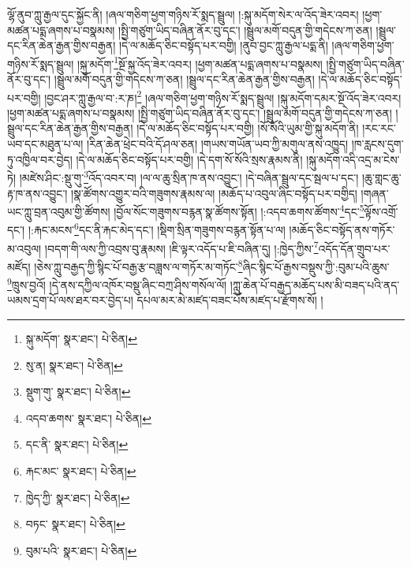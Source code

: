 ལྷོ་ནུབ་ཀླུ་རྒྱལ་དུང་སྐྱོང་ནི། །ཞལ་གཅིག་ཕྱག་གཉིས་རོ་སྨད་སྦྲུལ། །:སྐུ་མདོག་སེར་ལ་འོད་ཟེར་འབར། །ཕྱག་མཚན་པདྨ་ཞགས་པ་བསྣམས། །སྤྱི་གཙུག་ཡིད་བཞིན་ནོར་བུ་དང་། །སྦྲུལ་མགོ་བདུན་གྱི་གདེངས་ཀ་ཅན། །སྦྲུལ་དང་རིན་ཆེན་རྒྱན་གྱིས་བརྒྱན། །དེ་ལ་མཆོད་ཅིང་བསྟོད་པར་བགྱི། །ནུབ་བྱང་ཀླུ་རྒྱལ་པདྨ་ནི། །ཞལ་གཅིག་ཕྱག་གཉིས་རོ་སྨད་སྦྲུལ། །སྐུ་མདོག་\footnote{སྐུ་མདོག་  སྣར་ཐང་།  པེ་ཅིན། }སྔོ་སྐྱ་འོད་ཟེར་འབར། །ཕྱག་མཚན་པདྨ་ཞགས་པ་བསྣམས། །སྤྱི་གཙུག་ཡིད་བཞིན་ནོར་བུ་དང་། །སྦྲུལ་མགོ་བདུན་གྱི་གདེངས་ཀ་ཅན། །སྦྲུལ་དང་རིན་ཆེན་རྒྱན་གྱིས་བརྒྱན། །དེ་ལ་མཆོད་ཅིང་བསྟོད་པར་བགྱི། །བྱང་ཤར་ཀླུ་རྒྱལ་བ་:ར་ཎ།\footnote{སུ་ན།  སྣར་ཐང་།  པེ་ཅིན། } །ཞལ་གཅིག་ཕྱག་གཉིས་རོ་སྨད་སྦྲུལ། །སྐུ་མདོག་དམར་སྔོ་འོད་ཟེར་འབར། །ཕྱག་མཚན་པདྨ་ཞགས་པ་བསྣམས། །སྤྱི་གཙུག་ཡིད་བཞིན་ནོར་བུ་དང་། །སྦྲུལ་མགོ་བདུན་གྱི་གདེངས་ཀ་ཅན། །སྦྲུལ་དང་རིན་ཆེན་རྒྱན་གྱིས་བརྒྱན། །དེ་ལ་མཆོད་ཅིང་བསྟོད་པར་བགྱི། །སོ་སོའི་ཡུམ་གྱི་སྐུ་མདོག་ནི། །རང་རང་ཡབ་དང་མཐུན་པ་ལ། །རིན་ཆེན་ཕྲེང་བའི་དོ་ཤལ་ཅན། །གཡས་གཡོན་ཡབ་ཀྱི་མགུལ་ནས་འཁྱུད། །ཁ་རླངས་དུག་ཏུ་འཁྱིལ་བར་བྱེད། །དེ་ལ་མཆོད་ཅིང་བསྟོད་པར་བགྱི། །དེ་དག་སོ་སོའི་སྲས་རྣམས་ནི། །སྐུ་མདོག་འདི་འདྲ་མ་ངེས་ཏེ། །མཛེས་ཤིང་:སྡུ་གུ་\footnote{སྡུག་གུ་  སྣར་ཐང་།  པེ་ཅིན། }འོད་འབར་བ། །ལ་ལ་ཆུ་སྲིན་ཁ་ནས་འབྱུང་། །དེ་བཞིན་སྦྲུལ་དང་སྦལ་པ་དང་། །ཆུ་གླང་ཆུ་རྟ་ཁ་ནས་འབྱུང་། །སྣ་ཚོགས་འགྱུར་བའི་གཟུགས་རྣམས་ལ། །མཆོད་པ་འབུལ་ཞིང་བསྟོད་པར་བགྱིད། །གཞན་ཡང་ཀླུ་བྲན་འབུམ་གྱི་ཚོགས། །བྱོལ་སོང་གཟུགས་བརྙན་སྣ་ཚོགས་སྟོན། །:འདབ་ཆགས་ཚོགས་\footnote{འདབ་ཆགས་  སྣར་ཐང་།  པེ་ཅིན། }དང་\footnote{དང་ནི་  སྣར་ཐང་།  པེ་ཅིན། }ལྟོས་འགྲོ་དང་། །:རྐང་མངས་\footnote{རྐང་མང་  སྣར་ཐང་།  པེ་ཅིན། }དང་ནི་རྐང་མེད་དང་། །སྡིག་སྲིན་གཟུགས་བརྙན་སྟོན་པ་ལ། །མཆོད་ཅིང་བསྟོད་ནས་གཏོར་མ་འབུལ། །བདག་གི་ལས་ཀྱི་འབྲས་བུ་རྣམས། །ཇི་ལྟར་འདོད་པ་ཇི་བཞིན་དུ། །:ཁྱེད་ཀྱིས་\footnote{ཁྱེད་ཀྱི་  སྣར་ཐང་།  པེ་ཅིན། }འདོད་དོན་གྲུབ་པར་མཛོད། །ཅེས་ཀླུ་བརྒྱད་ཀྱི་སྙིང་པོ་བརྒྱ་རྩ་བཟླས་ལ་གཏོར་མ་གཏོང་\footnote{བཏང་  སྣར་ཐང་།  པེ་ཅིན། }ཞིང་སྙིང་པོ་རྒྱས་བསྡུས་ཀྱི་:བུམ་པའི་ཆུས་\footnote{བུམ་པའི་  སྣར་ཐང་།  པེ་ཅིན། }ཁྲུས་བྱའོ། །དེ་ནས་དཀྱིལ་འཁོར་བསྡུ་ཞིང་བཀྲ་ཤིས་གསོལ་ལོ། །ཀླུ་ཆེན་པོ་བརྒྱད་མཆོད་པས་མི་བཟད་པའི་ནད་ཡམས་དྲག་པོ་ལས་ཐར་བར་བྱེད་པ། དཔལ་མར་མེ་མཛད་བཟང་པོས་མཛད་པ་རྫོགས་སོ། ། 